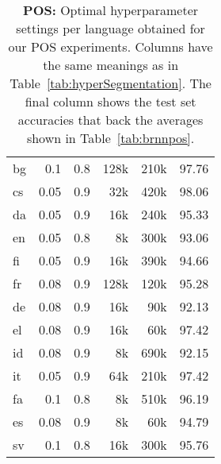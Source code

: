 \documentclass[11pt,letterpaper]{article}
\newcommand{\maincaptionref}{\ref{tab:hyperSegmentation}}
\begin{document}
\begin{table}[htbp]
\begin{tabular}{l|rrrrr}
bg & 0.1 & 0.8 & 128k & 210k & 97.76 \\
cs & 0.05 & 0.9 & 32k & 420k & 98.06 \\
da & 0.05 & 0.9 & 16k & 240k & 95.33 \\
en & 0.05 & 0.8 & 8k & 300k & 93.06 \\
fi & 0.05 & 0.9 & 16k & 390k & 94.66 \\
fr & 0.08 & 0.9 & 128k & 120k & 95.28 \\
de & 0.08 & 0.9 & 16k & 90k & 92.13 \\
el & 0.08 & 0.9 & 16k & 60k & 97.42 \\
id & 0.08 & 0.9 & 8k & 690k & 92.15 \\
it & 0.05 & 0.9 & 64k & 210k & 97.42 \\
fa & 0.1 & 0.8 & 8k & 510k & 96.19 \\
es & 0.08 & 0.9 & 8k & 60k & 94.79 \\
sv & 0.1 & 0.8 & 16k & 300k & 95.76 \\
\end{tabular}
  \caption{{\bf POS:} Optimal hyperparameter settings per language obtained for our POS experiments.
  Columns have the same meanings as in Table~\maincaptionref.
  The final column shows the test set accuracies that back the averages shown in Table~\ref{tab:brnnpos}.}
  \label{tab:hyperpos}
\end{table}
\end{document}
